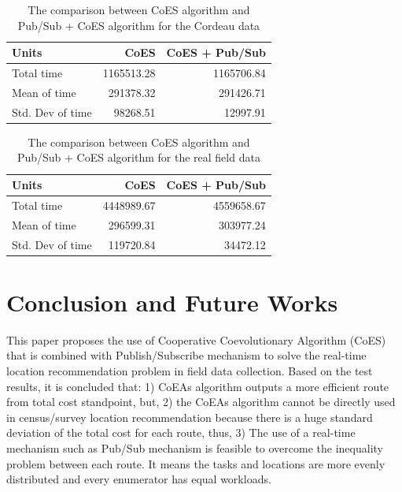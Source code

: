 \documentclass[conference]{IEEEtran}
\newcommand{\ra}[1]{\renewcommand{\arraystretch}{#1}}
\begin{document}
\begin{table}
	\centering
	\ra{1.3}
	\caption{The comparison between CoES algorithm and Pub/Sub + CoES algorithm for the Cordeau data}
	\label{tbl:test_result_normal_cordeau_comparison}
	\begin{tabular}{lrr}
		\toprule
			Units & CoES & CoES + Pub/Sub\\ 
		\midrule
			Total time & 1165513.28 & 1165706.84\\
			Mean of time & 291378.32 & 291426.71\\
			Std. Dev of time & 98268.51 & 12997.91\\
		\bottomrule
	\end{tabular}
\end{table}


\begin{table}
	\centering
	\ra{1.3}
	\caption{The comparison between CoES algorithm and Pub/Sub + CoES algorithm for the real field data}
	\label{tbl:test_result_normal_field_comparison}
	\begin{tabular}{lrr}
		\toprule
			Units & CoES & CoES + Pub/Sub\\ 
		\midrule
			Total time & 4448989.67 & 4559658.67\\
			Mean of time & 296599.31 & 303977.24\\
			Std. Dev of time & 119720.84 & 34472.12\\
		\bottomrule
	\end{tabular}
\end{table}


\section{Conclusion and Future Works}
\label{sec:conclusion-future-works}
This paper proposes the use of Cooperative Coevolutionary Algorithm (CoES) that is combined with Publish/Subscribe mechanism to solve the real-time location recommendation problem in field data collection. Based on the test results, it is concluded that: 1) CoEAs algorithm outputs a more efficient route from total cost standpoint, but, 2) the CoEAs algorithm cannot be directly used in census/survey location recommendation because there is a huge standard deviation of the total cost for each route, thus, 3) The use of a real-time mechanism such as Pub/Sub mechanism is feasible to overcome the inequality problem between each route. It means the tasks and locations are more evenly distributed and every enumerator has equal workloads. 
\end{document}
